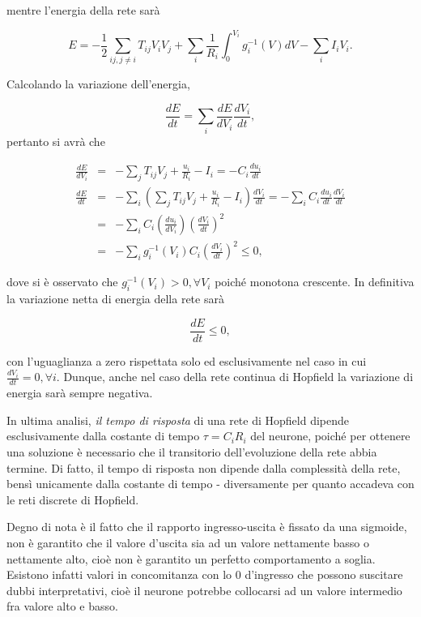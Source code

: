 \documentclass[10pt]{book}
\begin{document}
mentre l'energia della rete sarà


\begin{equation}
    E = -\frac 1 2 \sum_{ij, j\neq i} T_{ij} V_i V_j + \sum_i \frac{1}{R_i}
    \int_0^{V_i} g_i^{-1} (V) dV - \sum_i I_i V_i.
\end{equation}

Calcolando la variazione dell'energia, 

$$ \frac{dE}{dt} = \sum_i \frac{dE}{dV_i} \frac{dV_i}{dt},$$ pertanto si avrà che

\begin{eqnarray}\nonumber
    \frac{dE}{dV_i} & = & -\sum_j T_{ij}V_j + \frac{u_i}{R_i} - I_i = -C_i\frac{du_i}{dt} \\\nonumber
    \frac{dE}{dt}   & = & -\sum_i \left(\sum_j T_{ij}V_j + \frac{u_i}{R_i} - I_i\right)\frac{dV_i}{dt} = -\sum_i C_i\frac{du_i}{dt}\frac{dV_i}{dt} \\\nonumber
                    & = & -\sum_i C_i(\frac{du_i}{dV_i})\left(\frac{dV_i}{dt}\right)^2 \\\nonumber
                    & = & -\sum_i g_i^{-1}(V_i)C_i\left(\frac{dV_i}{dt}\right)^2 \leq 0,
\end{eqnarray}

dove si è osservato che $g_i^{-1}(V_i) > 0, \forall V_i$ poiché monotona
crescente. In definitiva la variazione netta di energia della rete sarà

\begin{equation}
    \frac{dE}{dt} \leq 0,
\end{equation}

con l'uguaglianza a zero rispettata solo ed esclusivamente nel caso in cui
$\displaystyle \frac{dV_i}{dt} = 0, \forall i$. Dunque, anche nel caso della
rete continua di Hopfield la variazione di energia sarà sempre negativa.

In ultima analisi, \emph{il tempo di risposta} di una rete di Hopfield dipende
esclusivamente dalla costante di tempo $\tau = C_i R_i$ del neurone, poiché per ottenere
una soluzione è necessario che il transitorio dell'evoluzione della rete abbia
termine. Di fatto, il tempo di risposta non dipende dalla complessità della
rete, bensì unicamente dalla costante di tempo \-- diversamente per quanto
accadeva con le reti discrete di Hopfield.

Degno di nota è il fatto che il rapporto ingresso-uscita è fissato da una
sigmoide, non è garantito che il valore d'uscita sia ad un valore nettamente
basso o nettamente alto, cioè non è garantito un perfetto comportamento a
soglia. Esistono infatti valori in concomitanza con lo $0$ d'ingresso che
possono suscitare dubbi interpretativi, cioè il neurone potrebbe collocarsi ad
un valore intermedio fra valore alto e basso. 
\end{document}
